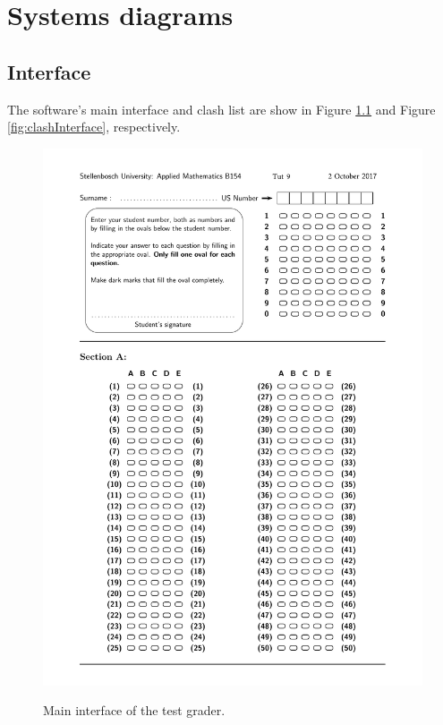 \chapter{Systems diagrams}
\label{ap:Algorithms}
\graphicspath{{Appendix4/Appendix4figures/}}

\section{Interface}
The software's main interface and clash list are show in Figure \ref{fig:mainInterface} and Figure \ref{fig:clashInterface}, respectively.

\begin{figure}
  \centering
  \includegraphics[width=14.2cm]{mainInterface}\\
  \caption{Main interface of the test grader.}
  \label{fig:mainInterface}
\end{figure}

